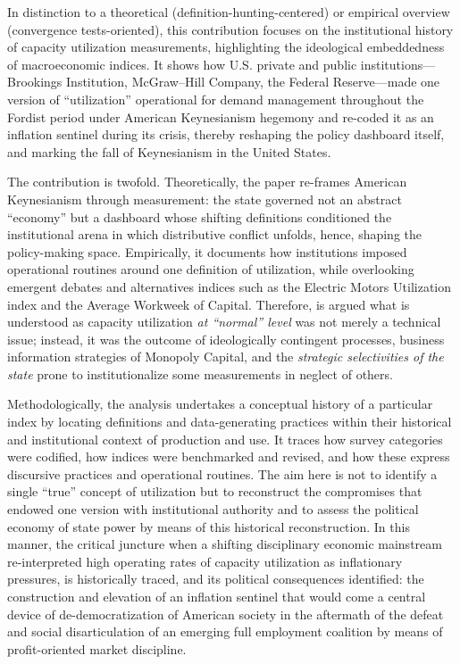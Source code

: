 \documentclass[11pt]{article}
\begin{document}
In distinction to a theoretical (definition-hunting-centered) or empirical overview (convergence tests-oriented), this contribution focuses on the institutional history of capacity utilization measurements, highlighting the ideological embeddedness of macroeconomic indices. It shows how U.S. private and public institutions---Brookings Institution, McGraw--Hill Company, the Federal Reserve---made one version of ``utilization'' operational for demand management throughout the Fordist period under American Keynesianism hegemony and re-coded it as an inflation sentinel during its crisis, thereby reshaping the policy dashboard itself, and marking the fall of Keynesianism in the United States.

The contribution is twofold. Theoretically, the paper re-frames American Keynesianism through measurement: the state governed not an abstract ``economy'' but a dashboard whose shifting definitions conditioned the institutional arena in which distributive conflict unfolds, hence, shaping the policy-making space. Empirically, it documents how institutions imposed operational routines around one definition of utilization, while overlooking emergent debates and alternatives indices such as the Electric Motors Utilization index and the Average Workweek of Capital. Therefore, is argued what is understood as capacity utilization \textit{at ``normal'' level} was not merely a technical issue; instead, it was the outcome of ideologically contingent processes, business information strategies of Monopoly Capital, and the \textit{strategic selectivities of the state} prone to institutionalize some measurements in neglect of others.

Methodologically, the analysis undertakes a conceptual history of a particular index by locating definitions and data-generating practices within their historical and institutional context of production and use. It traces how survey categories were codified, how indices were benchmarked and revised, and how these express discursive practices and operational routines. The aim here is not to identify a single ``true'' concept of utilization but to reconstruct the compromises that endowed one version with institutional authority and to assess the political economy of state power by means of this historical reconstruction. In this manner, the critical juncture when a shifting disciplinary economic mainstream re-interpreted high operating rates of capacity utilization as inflationary pressures, is historically traced, and its political consequences identified: the construction and elevation of an inflation sentinel that would come a central device of de-democratization of American society in the aftermath of the defeat and social disarticulation of an emerging full employment coalition by means of profit-oriented market discipline.
\end{document}
